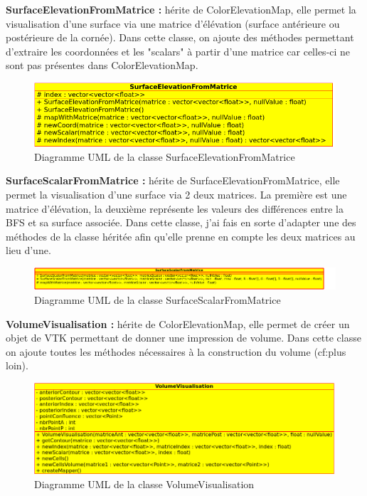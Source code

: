 \documentclass[a4paper,12pt]{article}
\begin{document}
\textbf{SurfaceElevationFromMatrice : }
hérite de ColorElevationMap, elle permet la visualisation d'une surface via une matrice d'élévation (surface antérieure ou postérieure de la cornée). Dans cette classe, on ajoute des méthodes permettant d'extraire les coordonnées et les "scalars" à partir d'une matrice car celles-ci ne sont pas présentes dans ColorElevationMap.

\begin{figure}[h]
	\centering
	\includegraphics[width=15cm]{SurfaceElevationFromMatrice.png} 
	\caption{Diagramme UML de la classe SurfaceElevationFromMatrice}
\end{figure}


\textbf{SurfaceScalarFromMatrice : }
hérite de SurfaceElevationFromMatrice, elle permet la visualisation d'une surface via 2 deux matrices. La première est une matrice d'élévation, la deuxième représente les valeurs des différences entre la BFS et sa surface associée. Dans cette classe, j'ai fais en sorte d'adapter une des méthodes de la classe héritée afin qu'elle prenne en compte les deux matrices au lieu d'une.

\begin{figure}[h]
	\centering
	\includegraphics[width=18cm]{SurfaceScalarFromMatrice.png} 
	\caption{Diagramme UML de la classe SurfaceScalarFromMatrice}
\end{figure}

\textbf{VolumeVisualisation : }
hérite de ColorElevationMap, elle permet de créer un objet de VTK permettant de donner une impression de volume. Dans cette classe on ajoute toutes les méthodes nécessaires à la construction du volume (cf:plus loin).

\begin{figure}[h]
	\includegraphics[width=18cm]{VolumeVisualisation.png} 
	\caption{Diagramme UML de la classe VolumeVisualisation}
\end{figure}
\end{document}
